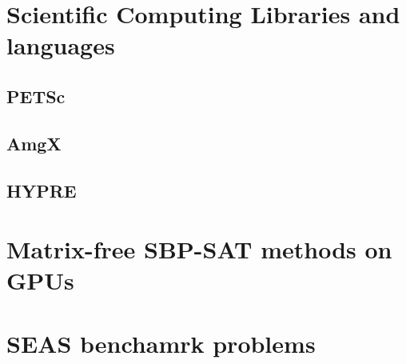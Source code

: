 \chapter{Scientific Computing Libraries and languages}
\section{PETSc}

\section{AmgX}

\section{HYPRE}





\chapter{Matrix-free SBP-SAT methods on GPUs}\label{chap:matrix-free}




\chapter{SEAS benchamrk problems}




